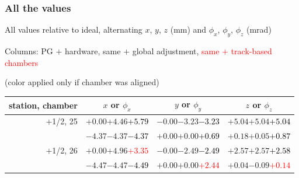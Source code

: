 \documentclass[compress]{beamer}
\begin{document}
\begin{frame}
\frametitle{All the values}
\tiny

All values relative to ideal, alternating $x$, $y$, $z$ (mm) and $\phi_x$, $\phi_y$, $\phi_z$ (mrad)

Columns: PG $+$ hardware, same $+$ global adjustment, \textcolor{red}{same $+$ track-based chambers}

\hfill (color applied only if chamber was aligned)

\vfill
\renewcommand{\arraystretch}{1.1}
\begin{tabular}{r | c | c | c}
station, chamber & $x$ or $\phi_x$ & $y$ or $\phi_y$ & $z$ or $\phi_z$ \\\hline
$+$1/2, 25 & $+0.00$\hspace{0.1 cm}$+4.46$\hspace{0.1 cm}\textcolor{black}{$+5.79$} & $-0.00$\hspace{0.1 cm}$-3.23$\hspace{0.1 cm}\textcolor{black}{$-3.23$} & $+5.04$\hspace{0.1 cm}$+5.04$\hspace{0.1 cm}\textcolor{black}{$+5.04$} \\
           & $-4.37$\hspace{0.1 cm}$-4.37$\hspace{0.1 cm}\textcolor{black}{$-4.37$} & $+0.00$\hspace{0.1 cm}$+0.00$\hspace{0.1 cm}\textcolor{black}{$+0.69$} & $+0.18$\hspace{0.1 cm}$+0.05$\hspace{0.1 cm}\textcolor{black}{$+0.87$} \\
$+$1/2, 26 & $+0.00$\hspace{0.1 cm}$+4.96$\hspace{0.1 cm}\textcolor{red}{$+3.35$} & $-0.00$\hspace{0.1 cm}$-2.49$\hspace{0.1 cm}\textcolor{black}{$-2.49$} & $+2.57$\hspace{0.1 cm}$+2.57$\hspace{0.1 cm}\textcolor{black}{$+2.58$} \\
           & $-4.47$\hspace{0.1 cm}$-4.47$\hspace{0.1 cm}\textcolor{black}{$-4.49$} & $+0.00$\hspace{0.1 cm}$+0.00$\hspace{0.1 cm}\textcolor{red}{$+2.44$} & $+0.04$\hspace{0.1 cm}$-0.09$\hspace{0.1 cm}\textcolor{red}{$+0.14$} \\

\end{tabular}
\end{frame}
\end{document}
